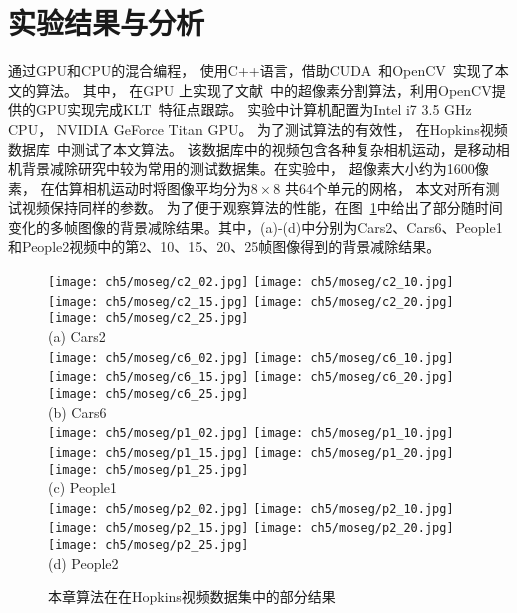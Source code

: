 \section{实验结果与分析}
\label{ch5:sec:results}
 通过GPU和CPU的混合编程， 使用C++语言，借助CUDA~\cite{CUDA}和OpenCV~\cite{opencv_library}实现了本文的算法。 其中， 在GPU 上实现了文献~\cite{superpixel}中的超像素分割算法，利用OpenCV提供的GPU实现完成KLT~\cite{KLT}特征点跟踪。 实验中计算机配置为Intel i7 3.5 GHz CPU， NVIDIA GeForce Titan GPU。 为了测试算法的有效性， 在Hopkins视频数据库~\cite{HopKinsDataSet}中测试了本文算法。 该数据库中的视频包含各种复杂相机运动，是移动相机背景减除研究中较为常用的测试数据集。在实验中， 超像素大小约为1600像素， 在估算相机运动时将图像平均分为$8 \times 8$ 共64个单元的网格， 本文对所有测试视频保持同样的参数。
 为了便于观察算法的性能，在图~\ref{ch5:fig:MosegResults}中给出了部分随时间变化的多帧图像的背景减除结果。其中，(a)-(d)中分别为Cars2、Cars6、People1和People2视频中的第2、10、15、20、25帧图像得到的背景减除结果。\par
 \begin{figure}[htb]
\begin{center}
 \texttt{[image: ch5/moseg/c2\_02.jpg]}
  \texttt{[image: ch5/moseg/c2\_10.jpg]}
  \texttt{[image: ch5/moseg/c2\_15.jpg]}
  \texttt{[image: ch5/moseg/c2\_20.jpg]}
  \texttt{[image: ch5/moseg/c2\_25.jpg]} \\
(a) Cars2\\
\texttt{[image: ch5/moseg/c6\_02.jpg]}
  \texttt{[image: ch5/moseg/c6\_10.jpg]}
  \texttt{[image: ch5/moseg/c6\_15.jpg]}
  \texttt{[image: ch5/moseg/c6\_20.jpg]}
  \texttt{[image: ch5/moseg/c6\_25.jpg]} \\

(b) Cars6\\
\texttt{[image: ch5/moseg/p1\_02.jpg]}
  \texttt{[image: ch5/moseg/p1\_10.jpg]}
  \texttt{[image: ch5/moseg/p1\_15.jpg]}
  \texttt{[image: ch5/moseg/p1\_20.jpg]}
  \texttt{[image: ch5/moseg/p1\_25.jpg]} \\

(c) People1\\
\texttt{[image: ch5/moseg/p2\_02.jpg]}
  \texttt{[image: ch5/moseg/p2\_10.jpg]}
  \texttt{[image: ch5/moseg/p2\_15.jpg]}
  \texttt{[image: ch5/moseg/p2\_20.jpg]}
  \texttt{[image: ch5/moseg/p2\_25.jpg]} \\

(d) People2\\
\end{center}
\caption{本章算法在在Hopkins视频数据集\cite{HopKinsDataSet}中的部分结果}
\label{ch5:fig:MosegResults}       %
\end{figure}
